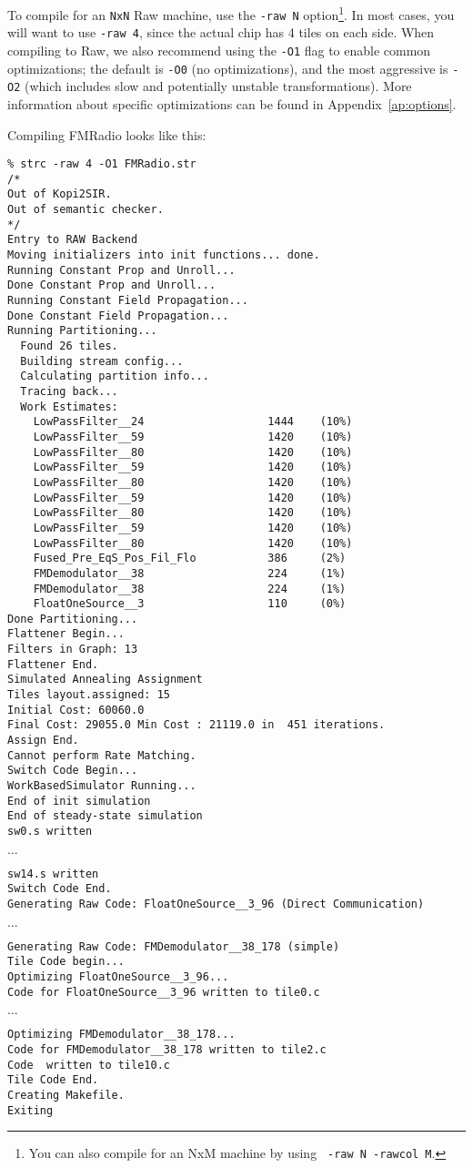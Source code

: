 To compile for an {\tt NxN} Raw machine, use the {\tt -raw N}
option\footnote{You can also compile for an NxM machine by using {\tt
-raw N -rawcol M}.}.  In most cases, you will want to use {\tt -raw
4}, since the actual chip has 4 tiles on each side.  When compiling to
Raw, we also recommend using the {\tt -O1} flag to enable common
optimizations; the default is {\tt -O0} (no optimizations), and the
most aggressive is {\tt -O2} (which includes slow and potentially
unstable transformations).  More information about specific
optimizations can be found in Appendix~\ref{ap:options}.

Compiling FMRadio looks like this: {\small
\begin{verbatim}
% strc -raw 4 -O1 FMRadio.str
/*
Out of Kopi2SIR.
Out of semantic checker.
*/
Entry to RAW Backend
Moving initializers into init functions... done.
Running Constant Prop and Unroll...
Done Constant Prop and Unroll...
Running Constant Field Propagation...
Done Constant Field Propagation...
Running Partitioning...
  Found 26 tiles.
  Building stream config...
  Calculating partition info...
  Tracing back...
  Work Estimates:
    LowPassFilter__24                   1444    (10%)
    LowPassFilter__59                   1420    (10%)
    LowPassFilter__80                   1420    (10%)
    LowPassFilter__59                   1420    (10%)
    LowPassFilter__80                   1420    (10%)
    LowPassFilter__59                   1420    (10%)
    LowPassFilter__80                   1420    (10%)
    LowPassFilter__59                   1420    (10%)
    LowPassFilter__80                   1420    (10%)
    Fused_Pre_EqS_Pos_Fil_Flo           386     (2%)
    FMDemodulator__38                   224     (1%)
    FMDemodulator__38                   224     (1%)
    FloatOneSource__3                   110     (0%)
Done Partitioning...
Flattener Begin...
Filters in Graph: 13
Flattener End.
Simulated Annealing Assignment
Tiles layout.assigned: 15
Initial Cost: 60060.0
Final Cost: 29055.0 Min Cost : 21119.0 in  451 iterations.
Assign End.
Cannot perform Rate Matching.
Switch Code Begin...
WorkBasedSimulator Running...
End of init simulation
End of steady-state simulation
sw0.s written
\end{verbatim}
$\dots$
\begin{verbatim}
sw14.s written
Switch Code End.
Generating Raw Code: FloatOneSource__3_96 (Direct Communication)
\end{verbatim}
$\dots$
\begin{verbatim}
Generating Raw Code: FMDemodulator__38_178 (simple)
Tile Code begin...
Optimizing FloatOneSource__3_96...
Code for FloatOneSource__3_96 written to tile0.c
\end{verbatim}
$\dots$
\begin{verbatim}
Optimizing FMDemodulator__38_178...
Code for FMDemodulator__38_178 written to tile2.c
Code  written to tile10.c
Tile Code End.
Creating Makefile.
Exiting
\end{verbatim}
} 
%

